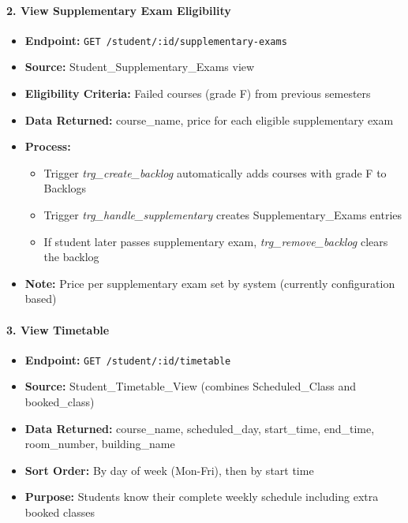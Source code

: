 \documentclass[12pt]{article}
\begin{document}
\paragraph{2. View Supplementary Exam Eligibility}
\begin{itemize}
    \item \textbf{Endpoint:} \texttt{GET /student/:id/supplementary-exams}
    \item \textbf{Source:} Student\_Supplementary\_Exams view
    \item \textbf{Eligibility Criteria:} Failed courses (grade F) from previous semesters
    \item \textbf{Data Returned:} course\_name, price for each eligible supplementary exam
    \item \textbf{Process:}
        \begin{itemize}
            \item Trigger \textit{trg\_create\_backlog} automatically adds courses with grade F to Backlogs
            \item Trigger \textit{trg\_handle\_supplementary} creates Supplementary\_Exams entries
            \item If student later passes supplementary exam, \textit{trg\_remove\_backlog} clears the backlog
        \end{itemize}
    \item \textbf{Note:} Price per supplementary exam set by system (currently configuration based)
\end{itemize}

\paragraph{3. View Timetable}
\begin{itemize}
    \item \textbf{Endpoint:} \texttt{GET /student/:id/timetable}
    \item \textbf{Source:} Student\_Timetable\_View (combines Scheduled\_Class and booked\_class)
    \item \textbf{Data Returned:} course\_name, scheduled\_day, start\_time, end\_time, room\_number, building\_name
    \item \textbf{Sort Order:} By day of week (Mon-Fri), then by start time
    \item \textbf{Purpose:} Students know their complete weekly schedule including extra booked classes
\end{itemize}
\end{document}
